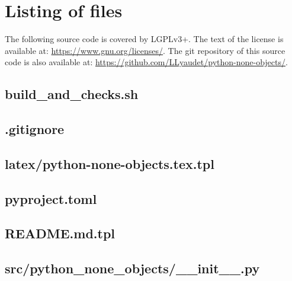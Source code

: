 \documentclass{article}
\begin{document}
\section{Listing of files}
\label{section:listing}

The following source code is covered by LGPLv3+.
The text of the license is available at:
\url{https://www.gnu.org/licenses/}.
The git repository of this source code is also available at:
\url{https://github.com/LLyaudet/python-none-objects/}.


\subsection{
  build\_and\_checks.sh
}
\label{
  build_and_checkssh
}



\subsection{
  .gitignore
}
\label{
  gitignore
}



\subsection{
  latex/python-none-objects.tex.tpl
}
\label{
  latex:python-none-objectstextpl
}



\subsection{
  pyproject.toml
}
\label{
  pyprojecttoml
}



\subsection{
  README.md.tpl
}
\label{
  READMEmdtpl
}



\subsection{
  src/python\_none\_objects/\_\_init\_\_.py
}
\label{
  src:python_none_objects:__init__py
}
\end{document}
